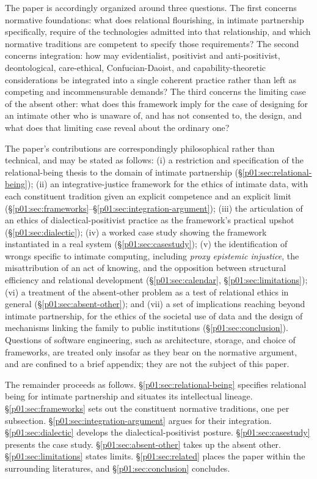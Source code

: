 \documentclass[11pt,a4paper]{article}
\begin{document}
The paper is accordingly organized around three questions. The first concerns normative foundations: what does relational flourishing, in intimate partnership specifically, require of the technologies admitted into that relationship, and which normative traditions are competent to specify those requirements? The second concerns integration: how may evidentialist, positivist and anti-positivist, deontological, care-ethical, Confucian-Daoist, and capability-theoretic considerations be integrated into a single coherent practice rather than left as competing and incommensurable demands? The third concerns the limiting case of the absent other: what does this framework imply for the case of designing for an intimate other who is unaware of, and has not consented to, the design, and what does that limiting case reveal about the ordinary one?

The paper's contributions are correspondingly philosophical rather than technical, and may be stated as follows: (i) a restriction and specification of the relational-being thesis to the domain of intimate partnership (§\ref{p01:sec:relational-being}); (ii) an integrative-justice framework for the ethics of intimate data, with each constituent tradition given an explicit competence and an explicit limit (§\ref{p01:sec:frameworks}--§\ref{p01:sec:integration-argument}); (iii) the articulation of an ethics of dialectical-positivist practice as the framework's practical upshot (§\ref{p01:sec:dialectic}); (iv) a worked case study showing the framework instantiated in a real system (§\ref{p01:sec:casestudy}); (v) the identification of wrongs specific to intimate computing, including \emph{proxy epistemic injustice}, the misattribution of an act of knowing, and the opposition between structural efficiency and relational development (§\ref{p01:sec:calendar}, §\ref{p01:sec:limitations}); (vi) a treatment of the absent-other problem as a test of relational ethics in general (§\ref{p01:sec:absent-other}); and (vii) a set of implications reaching beyond intimate partnership, for the ethics of the societal use of data and the design of mechanisms linking the family to public institutions (§\ref{p01:sec:conclusion}). Questions of software engineering, such as architecture, storage, and choice of frameworks, are treated only insofar as they bear on the normative argument, and are confined to a brief appendix; they are not the subject of this paper.

The remainder proceeds as follows. §\ref{p01:sec:relational-being} specifies relational being for intimate partnership and situates its intellectual lineage. §\ref{p01:sec:frameworks} sets out the constituent normative traditions, one per subsection. §\ref{p01:sec:integration-argument} argues for their integration. §\ref{p01:sec:dialectic} develops the dialectical-positivist posture. §\ref{p01:sec:casestudy} presents the case study. §\ref{p01:sec:absent-other} takes up the absent other. §\ref{p01:sec:limitations} states limits. §\ref{p01:sec:related} places the paper within the surrounding literatures, and §\ref{p01:sec:conclusion} concludes.
\end{document}

